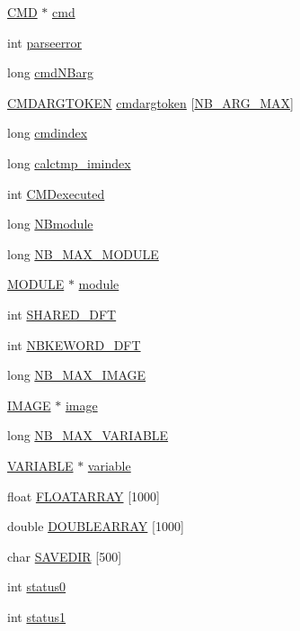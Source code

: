 \begin{DoxyCompactItemize}
\item 
\hyperlink{structCMD}{C\+M\+D} $\ast$ \hyperlink{structDATA_af0e58ce879fa3017d9131eed5a90cc96}{cmd}
\item 
int \hyperlink{structDATA_a04c14ba8ea1844e3f68888dca0fe3519}{parseerror}
\item 
long \hyperlink{structDATA_a6facd114f508ec4fcb52003b9f93d123}{cmd\+N\+Barg}
\item 
\hyperlink{structCMDARGTOKEN}{C\+M\+D\+A\+R\+G\+T\+O\+K\+E\+N} \hyperlink{structDATA_a1072fcd97dbe8660a3b3d7d54b21b300}{cmdargtoken} \mbox{[}\hyperlink{CLIcore_8h_a0a6b220d813ff622977cf6d7f1f5ffa6}{N\+B\+\_\+\+A\+R\+G\+\_\+\+M\+A\+X}\mbox{]}
\item 
long \hyperlink{structDATA_af462cdcbd42307c3dacf0891ba4dd8ca}{cmdindex}
\item 
long \hyperlink{structDATA_a11b6d226ab6612bc5a418abb89b56feb}{calctmp\+\_\+imindex}
\item 
int \hyperlink{structDATA_a51e21d55f2eeba8ae6c9f9f02311eeef}{C\+M\+Dexecuted}
\item 
long \hyperlink{structDATA_a4ef780e882fa0d3ad2462be54dc58f4e}{N\+Bmodule}
\item 
long \hyperlink{structDATA_aa3ce94f1c13e2a2b3acc31caca1f3b95}{N\+B\+\_\+\+M\+A\+X\+\_\+\+M\+O\+D\+U\+L\+E}
\item 
\hyperlink{structMODULE}{M\+O\+D\+U\+L\+E} $\ast$ \hyperlink{structDATA_a0a1527cfaff533ba10df8cfdf519002a}{module}
\item 
int \hyperlink{structDATA_a64d5b0ed5d5cedf11ff69ebf8d30dc20}{S\+H\+A\+R\+E\+D\+\_\+\+D\+F\+T}
\item 
int \hyperlink{structDATA_aece2a33a30b5f15d8250cee2a8f0aa02}{N\+B\+K\+E\+W\+O\+R\+D\+\_\+\+D\+F\+T}
\item 
long \hyperlink{structDATA_a2522406c33b8f890757cfbd8db858f77}{N\+B\+\_\+\+M\+A\+X\+\_\+\+I\+M\+A\+G\+E}
\item 
\hyperlink{structIMAGE}{I\+M\+A\+G\+E} $\ast$ \hyperlink{structDATA_aafd2755d1c0845d9f671d42c916469ed}{image}
\item 
long \hyperlink{structDATA_adbdde6182898eaf675b02e337dc93750}{N\+B\+\_\+\+M\+A\+X\+\_\+\+V\+A\+R\+I\+A\+B\+L\+E}
\item 
\hyperlink{structVARIABLE}{V\+A\+R\+I\+A\+B\+L\+E} $\ast$ \hyperlink{structDATA_a38336f0ef793c2aef2a6f3a20e3e361b}{variable}
\item 
float \hyperlink{structDATA_a58210ca81311d78d220027755351f8b8}{F\+L\+O\+A\+T\+A\+R\+R\+A\+Y} \mbox{[}1000\mbox{]}
\item 
double \hyperlink{structDATA_a15076d931e1bc151a4a9933e09f344b1}{D\+O\+U\+B\+L\+E\+A\+R\+R\+A\+Y} \mbox{[}1000\mbox{]}
\item 
char \hyperlink{structDATA_a883b88f5c5cca024bfc4240cda302dd7}{S\+A\+V\+E\+D\+I\+R} \mbox{[}500\mbox{]}
\item 
int \hyperlink{structDATA_a14eafa363f5cd5dd7ff9ca0744029565}{status0}
\item 
int \hyperlink{structDATA_acc1a46fa384934e24a89660d8d0c9f7a}{status1}
\end{DoxyCompactItemize}


